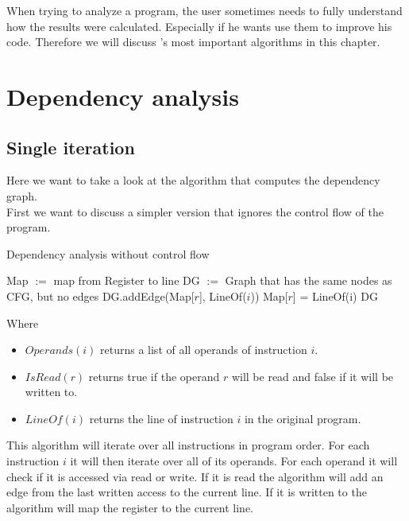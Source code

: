 When trying to analyze a program, the user sometimes needs to fully understand how the results were calculated. Especially if he wants use them to improve his code. Therefore we will discuss \suaca's most important algorithms in this chapter.

\section{Dependency analysis}
\label{sec:depanalysis}

\subsection{Single iteration}

Here we want to take a look at the algorithm that computes the dependency graph. \\
First we want to discuss a simpler version that ignores the control flow of the program.

\begin{algorithm}[H]
    \SetAlgoLined
    \caption{Dependency analysis without control flow}
    \label{alg:depsingle}
    Map $:=$ map from Register to line\;
    DG $:=$ Graph that has the same nodes as CFG, but no edges\;
     {
          {
              {
                 DG.addEdge(Map[$r$], LineOf($i$))\;
             }{
                Map[$r$] = LineOf(i)\;
            }
        }
    }
    \Return DG\;
\end{algorithm}

\newpage

Where
\begin{itemize}
    \item $Operands(i)$ returns a list of all operands of instruction $i$.
    \item $IsRead(r)$ returns true if the operand $r$ will be read and false if it will be written to.
    \item $LineOf(i)$ returns the line of instruction $i$ in the original program.
\end{itemize}

This algorithm will iterate over all instructions in program order. For each instruction $i$ it will then iterate over all of its operands. For each operand it will check if it is accessed via read or write. If it is read the algorithm will add an edge from the last written access to the current line. If it is written to the algorithm will map the register to the current line.\\

